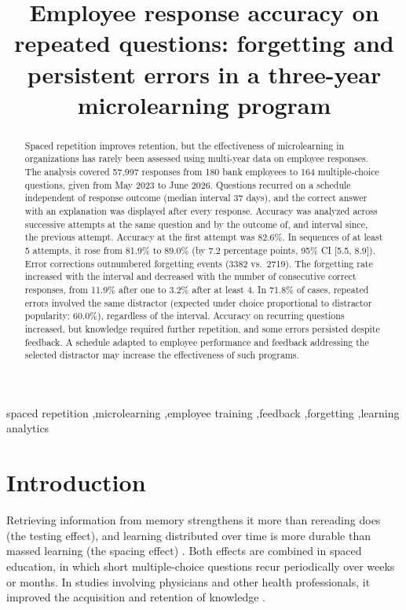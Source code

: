 \documentclass[preprint,12pt,authoryear]{elsarticle}
\begin{document}
\begin{frontmatter}

\title{Employee response accuracy on repeated questions: forgetting and persistent errors in a three-year microlearning program}

\begin{abstract}
Spaced repetition improves retention, but the effectiveness of
microlearning in organizations has rarely been assessed using multi-year data on employee responses.
The analysis covered 57{,}997 responses from 180 bank employees to
164 multiple-choice questions, given from May 2023 to June 2026. Questions recurred on
a schedule independent of response outcome (median interval 37 days), and the correct answer
with an explanation was displayed after every response. Accuracy was analyzed across successive
attempts at the same question and by the outcome of, and interval since, the previous attempt.
Accuracy at the first attempt was 82.6\%. In sequences of at least
5 attempts, it rose from 81.9\% to 89.0\% (by 7.2 percentage points, 95\% CI
[5.5, 8.9]). Error corrections outnumbered forgetting events (3382 vs.\
2719).
The forgetting rate increased with the interval and decreased with the number of consecutive correct
responses, from 11.9\% after one to 3.2\% after at least 4. In
71.8\% of cases, repeated errors involved the same distractor (expected under choice
proportional to distractor popularity: 60.0\%), regardless of the interval.
Accuracy on recurring questions increased, but knowledge required further
repetition, and some errors persisted despite feedback. A schedule adapted to employee performance and
feedback addressing the selected distractor may increase the effectiveness of such programs.
\end{abstract}

\begin{keyword}
spaced repetition \sep microlearning \sep employee training \sep feedback \sep forgetting \sep learning analytics
\end{keyword}

\end{frontmatter}

\linenumbers

\section{Introduction}

Retrieving information from memory strengthens it more than rereading does (the testing effect), and
learning distributed over time is more durable than massed learning (the spacing effect)
\citep{roediger2006,cepeda2006}. Both effects are combined in spaced education, in which short
multiple-choice questions recur periodically over weeks or months. In studies involving physicians and
other health professionals, it improved the acquisition and retention of knowledge
\citep{kerfoot2009,phillips2019}.
\end{document}
